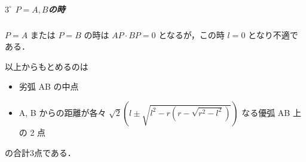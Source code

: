 \documentclass[../../main.tex]{subfiles}
\begin{document}
\subparagraph{$3^{\circ}$ $P=A,B$の時}

$P = A$ または $P = B$ の時は $AP \cdot BP = 0$ となるが，この時 $l = 0$ となり不適である．
\casesend

以上からもとめるのは
\begin{itemize}
  \item 劣弧 AB の中点 \\
  \item A, B からの距離が各々 $\sqrt{2}\left(l \pm \sqrt{l^2 - r\left(r - \sqrt{r^2 - l^2}\right)} \right)$ なる優弧 AB 上の 2 点
\end{itemize}
の合計$3$点である．

\newpage
\end{document}
